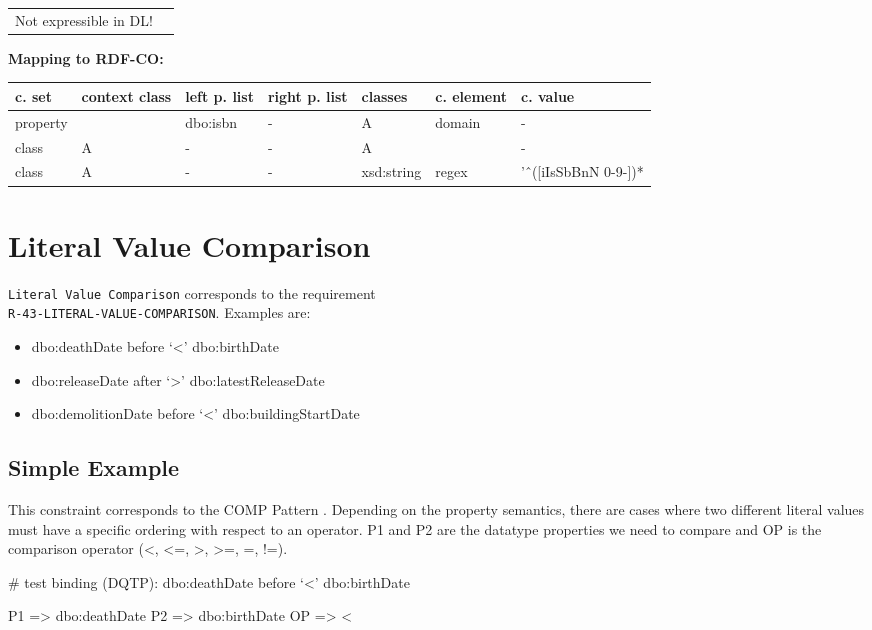 \documentclass{llncs}
\newcommand{\ms}[1]{\texttt{#1}}
\newenvironment{gcotable}{
  \scriptsize
  \sffamily
  \vspace{0cm}
	\begin{center}
	\textbf{\vspace{0.4cm}Mapping to RDF-CO:} \\
  \begin{tabular}{l|l|l|l|l|l|l}
	\hline
  \textbf{c. set} & \textbf{context class} & \textbf{left p. list} & \textbf{right p. list} & \textbf{classes} & \textbf{c. element} & \textbf{c. value} \\
  \hline

}{
  \hline
  \end{tabular}
	\end{center}
}
\newenvironment{DL}{
\vspace{0cm}
	\begin{center}
  \begin{tabular}{r l}

}{
  \end{tabular}
	\end{center}
}
\begin{document}
\begin{DL}
Not expressible in DL!
\end{DL}

\begin{gcotable}
property &  & dbo:isbn & - &  A & domain & - \\
class &  A & - & - & A &  & - \\
class & A & - & - & xsd:string & regex & 'ˆ([iIsSbBnN 0-9-])* \\
\end{gcotable}

\section{Literal Value Comparison}

\ms{Literal Value Comparison} corresponds to the requirement \\
\ms{R-43-LITERAL-VALUE-COMPARISON}.
Examples are:

\begin{itemize}
	\item dbo:deathDate before ‘\textless’ dbo:birthDate
  \item dbo:releaseDate after ‘\textgreater’ dbo:latestReleaseDate
  \item dbo:demolitionDate before ‘\textless’ dbo:buildingStartDate
\end{itemize}

\subsection{Simple Example}

\begin{ex}
# DQTP:
SELECT ?s WHERE { 
    ?s ?s FILTER ( ?v1 \end{ex}

This constraint corresponds to the COMP Pattern \cite{Kontokostas2014}. 
Depending on the property semantics,
there are cases where two different literal values must have
a specific ordering with respect to an operator. 
P1 and P2 are the datatype properties we need to compare and 
OP is the comparison operator (\textless, \textless=, \textgreater, \textgreater=, =, !=). 

\begin{ex}
# test binding (DQTP):
dbo:deathDate before ‘<’ dbo:birthDate

P1 => dbo:deathDate
P2 => dbo:birthDate
OP => <
\end{ex}
\end{document}
